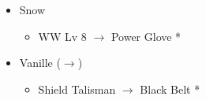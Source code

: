 \begin{menu}
\begin{itemize}
			\equip
			\begin{itemize}
				\item Snow
				      \begin{itemize}
					      \item WW Lv 8 $\rightarrow$ Power Glove *
				      \end{itemize}
				\item Vanille ($\rightarrow$)
				      \begin{itemize}
					      \item Shield Talisman $\rightarrow$ Black Belt *
				      \end{itemize}
			\end{itemize}
		\end{itemize}
	\end{menu}